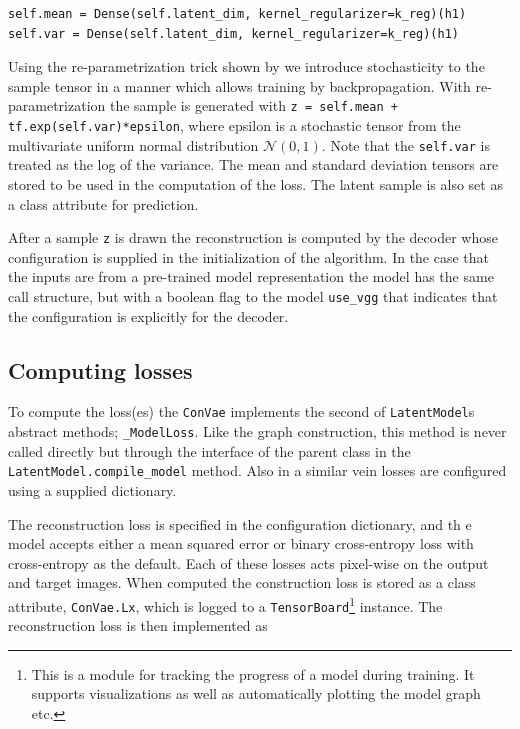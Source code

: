 \begin{lstlisting}[language=iPython]
self.mean = Dense(self.latent_dim, kernel_regularizer=k_reg)(h1)
self.var = Dense(self.latent_dim, kernel_regularizer=k_reg)(h1)
\end{lstlisting}

 Using the re-parametrization trick shown by \citet{Kingma2013} we introduce stochasticity to the sample tensor in a manner which allows training by backpropagation. With re-parametrization the sample is generated with \lstinline{z = self.mean + tf.exp(self.var)*epsilon}, where epsilon is a stochastic tensor from the multivariate uniform normal distribution $\mathcal{N}(0, 1)$. Note that the \lstinline{self.var} is treated as the log of the variance. The mean and standard deviation tensors are stored to be used in the computation of the loss. The latent sample is also set as a class attribute for prediction.

After a sample \lstinline{z} is drawn the reconstruction is computed by the decoder whose configuration is supplied in the initialization of the algorithm. In the case that the inputs are from a pre-trained model representation the model has the same call structure, but with a boolean flag to the model \lstinline{use_vgg} that indicates that the configuration is explicitly for the decoder. 

\subsection{Computing losses}

To compute the loss(es) the \lstinline{ConVae} implements the second of \lstinline{LatentModel}s abstract methods; \lstinline{_ModelLoss}. Like the graph construction, this method is never called directly but through the interface of the parent class in the \lstinline{LatentModel.compile_model} method. Also in a similar vein losses are configured using a supplied dictionary.

The reconstruction loss is specified in the configuration dictionary, and th e model accepts either a mean squared error or binary cross-entropy loss with cross-entropy as the default. Each of these losses acts pixel-wise on the output and target images. When computed the construction loss is stored as a class attribute, \lstinline{ConVae.Lx}, which is logged to a \lstinline{TensorBoard}\footnote{This is a module for tracking the progress of a model during training. It supports visualizations as well as automatically plotting the model graph etc.} instance. The reconstruction loss is then implemented as 

